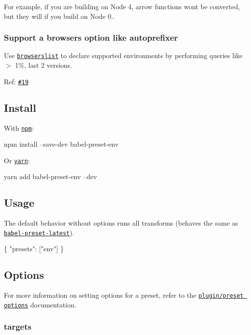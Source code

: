 For example, if you are building on Node 4, arrow functions won\textquotesingle{}t be converted, but they will if you build on Node 0..

\subsubsection*{Support a {\ttfamily browsers} option like autoprefixer}

Use \href{https://github.com/ai/browserslist}{\tt browserslist} to declare supported environments by performing queries like {\ttfamily $>$ 1\%, last 2 versions}.

Ref\+: \href{https://github.com/babel/babel-preset-env/pull/19}{\tt \#19}

\subsection*{Install}

With \href{https://www.npmjs.com}{\tt npm}\+:


\begin{DoxyCode}
npm install --save-dev babel-preset-env
\end{DoxyCode}


Or \href{https://yarnpkg.com}{\tt yarn}\+:


\begin{DoxyCode}
yarn add babel-preset-env --dev
\end{DoxyCode}


\subsection*{Usage}

The default behavior without options runs all transforms (behaves the same as \href{https://babeljs.io/docs/plugins/preset-latest/}{\tt babel-\/preset-\/latest}).


\begin{DoxyCode}
\{
  "presets": ["env"]
\}
\end{DoxyCode}


\subsection*{Options}

For more information on setting options for a preset, refer to the \href{http://babeljs.io/docs/plugins/#plugin-preset-options}{\tt plugin/preset options} documentation.

\subsubsection*{{\ttfamily targets}}

